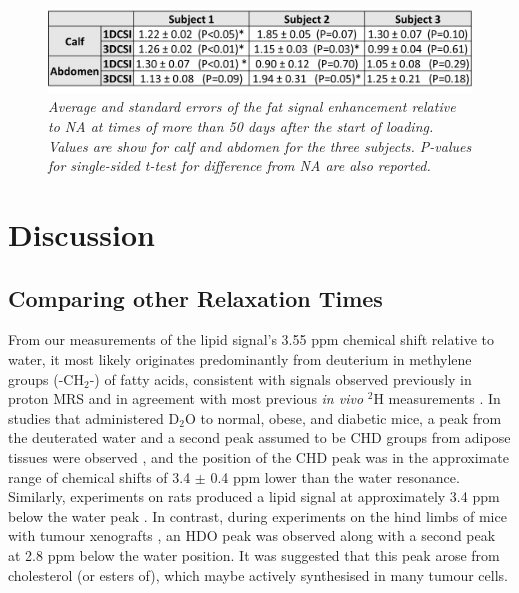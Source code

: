 \begin{figure}
    \centering
    \includegraphics[width=1\textwidth]{Figures/Lipid/Lipid_Table.png}
    \caption{\textit{Average and standard errors of the fat signal enhancement relative to \ac{NA} at times of more than 50 days after the start of loading. Values are show for calf and abdomen for the three subjects. P-values for single-sided t-test for difference from \ac{NA} are also reported.}}
    \label{fig:Lip:Amp_Table}
\end{figure}

\section{Discussion}

\subsection{Comparing other Relaxation Times}

From our measurements of the lipid signal’s 3.55 ppm chemical shift relative to water, it most likely originates predominantly from deuterium in methylene groups (-CH$_2$-) of fatty acids, consistent with signals observed previously in proton \ac{MRS} \cite{Ren2008CompositionTesla} and in agreement with most previous \textit{in vivo} $^2$H measurements \cite{Brereton1989TheMice}. In studies that administered D$_2$O to normal, obese, and diabetic mice, a peak from the deuterated water and a second peak assumed to be CHD groups from adipose tissues were observed \cite{Brereton1986PreliminarySpectroscopy, Brereton1989TheMice}, and the position of the CHD peak was in the approximate range of chemical shifts of 3.4 $\pm$ 0.4 ppm lower than the water resonance. Similarly, experiments on rats produced a lipid signal at approximately 3.4 ppm below the water peak \cite{Kosenkov2018TheMice}. In contrast, during experiments on the hind limbs of mice with tumour xenografts \cite{Assmann2020InCholesterol}, an \ac{HDO} peak was observed along with a second peak at 2.8 ppm below the water position. It was suggested \cite{Assmann2020InCholesterol} that this peak arose from cholesterol (or esters of), which maybe actively synthesised in many tumour cells.

